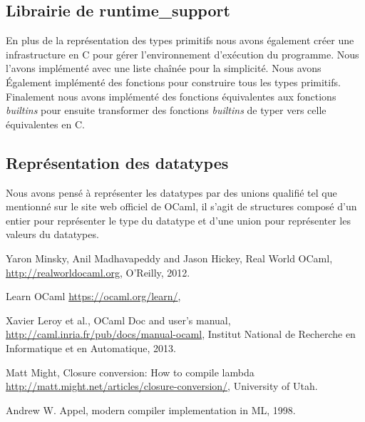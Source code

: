 \documentclass{article}
\begin{document}
\subsection{Librairie de runtime\_support}
En plus de la représentation des types primitifs nous avons également créer
une infrastructure en C pour gérer l'environnement d'exécution du programme.
Nous l'avons implémenté avec une liste chaînée pour la simplicité. Nous avons
Également implémenté des fonctions pour construire tous les types primitifs.
Finalement nous avons implémenté des fonctions équivalentes aux fonctions
\textit{builtins} pour ensuite transformer des fonctions \textit{builtins}
de typer vers celle équivalentes en C.

\subsection{Représentation des datatypes}
Nous avons pensé à représenter les datatypes par des unions qualifié tel que
mentionné sur le site web officiel de OCaml, il s'agit de structures composé
d'un entier pour représenter le type du datatype et d'une union pour
représenter les valeurs du datatypes.

\begin{thebibliography}{9}

	Yaron Minsky, Anil Madhavapeddy and Jason Hickey,
	Real World OCaml,
	\url{http://realworldocaml.org},
	O'Reilly,
	2012.

	Learn OCaml
	\url{https://ocaml.org/learn/},

	Xavier Leroy et al.,
	OCaml Doc and user's manual,
	\url{http://caml.inria.fr/pub/docs/manual-ocaml},
	Institut National de Recherche en Informatique et en Automatique,
	2013.

	Matt Might,
  Closure conversion: How to compile lambda
	\url{http://matt.might.net/articles/closure-conversion/},
  University of Utah.
   
    Andrew W. Appel,
    modern compiler implementation in ML,
    1998.

\end{thebibliography}
\end{document}
